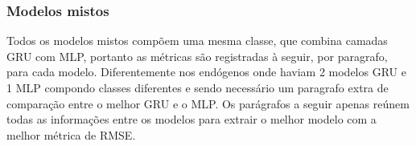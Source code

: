 \documentclass[	12pt, Times, openright, twoside, a4paper, english, brazil]{abntex2}
\begin{document}
                 \begin{figure}[H]
            \end{figure}
            
    	    \subsubsection{Modelos mistos}
    	       Todos os modelos mistos compõem uma mesma classe, que combina camadas GRU com MLP, portanto as métricas são registradas à seguir, por paragrafo, para cada modelo. Diferentemente nos endógenos onde haviam 2 modelos GRU e 1 MLP compondo classes diferentes e sendo necessário um paragrafo extra de comparação entre o melhor GRU e o MLP.
    	       Os parágrafos a seguir apenas reúnem todas as informações entre os modelos para extrair o melhor modelo com a melhor métrica de RMSE.
    	    
\end{document}
